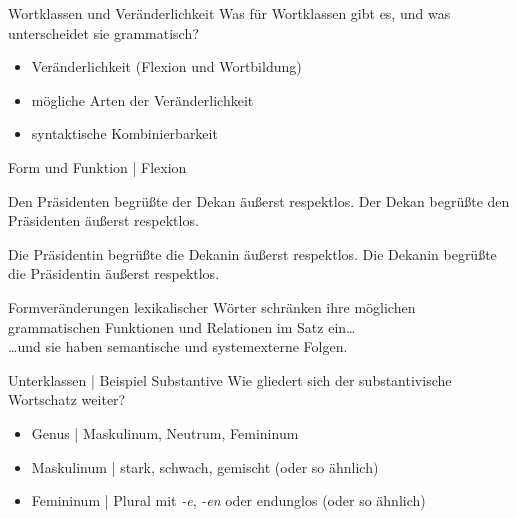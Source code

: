 \begin{frame}
  {Wortklassen und Veränderlichkeit}
  \onslide<+->
  \onslide<+->
  Was für Wortklassen gibt es, und was unterscheidet sie \alert{grammatisch}?\\
  \onslide<+->
  \onslide<+->
  \Zeile
  \begin{itemize}[<+->]
    \item Veränderlichkeit (Flexion und Wortbildung)
    \item mögliche Arten der Veränderlichkeit
    \item syntaktische Kombinierbarkeit
  \end{itemize}
\end{frame}

\begin{frame}
  {Form und Funktion | Flexion}
  \onslide<+->
  \onslide<+->
  \begin{exe}
    \ex
    \begin{xlist}
      \ex \alert{Den Präsidenten} begrüßte \alert{der Dekan} äußerst respektlos.
       \onslide<+->
      \ex \alert{Der Dekan} begrüßte \alert{den Präsidenten} äußerst respektlos.
    \end{xlist}
    \onslide<+->
    \ex
    \begin{xlist}
      \ex \alert{Die Präsidentin} begrüßte \alert{die Dekanin} äußerst respektlos.
      \onslide<+->
      \ex \alert{Die Dekanin} begrüßte \alert{die Präsidentin} äußerst respektlos.
    \end{xlist}
  \end{exe}
  \onslide<+->
  \Zeile
  Formveränderungen lexikalischer Wörter \alert{schränken ihre möglichen grammatischen Funktionen und Relationen im Satz ein}\dots\\
  \onslide<+->
  \Halbzeile
  \dots und sie haben semantische und systemexterne Folgen.
\end{frame}

\begin{frame}
  {Unterklassen | Beispiel Substantive}
  \onslide<+->
  \onslide<+->
  Wie gliedert sich der substantivische Wortschatz weiter?
  \onslide<+->
  \onslide<+->
  \Zeile
  \begin{itemize}[<+->]
    \item \alert{Genus} | Maskulinum, Neutrum, Femininum
    \item Maskulinum | \alert{stark}, \alert{schwach}, \alert{gemischt} (oder so ähnlich)
    \item Femininum | Plural mit \textit{-e}, \textit{-en} oder endunglos (oder so ähnlich) 
  \end{itemize}
\end{frame}

